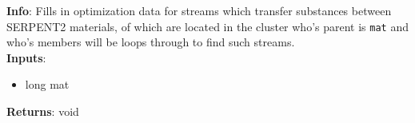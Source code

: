 \textbf{Info}: Fills in optimization data for streams which transfer substances
between SERPENT2 materials, of which are located in the cluster who's parent is
\texttt{mat} and who's members will be loops through to find such streams. \\

\noindent \textbf{Inputs}:
\begin{itemize}
\item{long mat}
\end{itemize}

\noindent \textbf{Returns}: void
